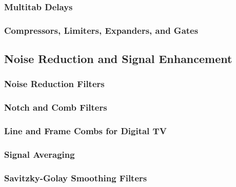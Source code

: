 \subsubsection{Multitab Delays}
\subsubsection{Compressors, Limiters, Expanders, and Gates}

\subsection{Noise Reduction and Signal Enhancement}
\subsubsection{Noise Reduction Filters}
\subsubsection{Notch and Comb Filters}
\subsubsection{Line and Frame Combs for Digital TV}
\subsubsection{Signal Averaging}
\subsubsection{Savitzky-Golay Smoothing Filters}



